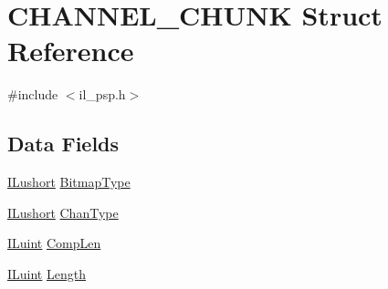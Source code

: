 \hypertarget{struct_c_h_a_n_n_e_l___c_h_u_n_k}{\section{C\-H\-A\-N\-N\-E\-L\-\_\-\-C\-H\-U\-N\-K Struct Reference}
\label{struct_c_h_a_n_n_e_l___c_h_u_n_k}
}


{\ttfamily \#include $<$il\-\_\-psp.\-h$>$}

\subsection*{Data Fields}
\begin{DoxyCompactItemize}
\item 
\hyperlink{il_8h_af6287b43748354a7c4864da43ae56962}{I\-Lushort} \hyperlink{struct_c_h_a_n_n_e_l___c_h_u_n_k_a20cdfbd91909040f376c934cbf801c0b}{Bitmap\-Type}
\item 
\hyperlink{il_8h_af6287b43748354a7c4864da43ae56962}{I\-Lushort} \hyperlink{struct_c_h_a_n_n_e_l___c_h_u_n_k_a35cf121b38b7eb818c3a662802ac29b7}{Chan\-Type}
\item 
\hyperlink{il_8h_ac6508d0e9c19e32f32e00d54b5b8cf30}{I\-Luint} \hyperlink{struct_c_h_a_n_n_e_l___c_h_u_n_k_a73df60c17832e4c88c7e827c78d09838}{Comp\-Len}
\item 
\hyperlink{il_8h_ac6508d0e9c19e32f32e00d54b5b8cf30}{I\-Luint} \hyperlink{struct_c_h_a_n_n_e_l___c_h_u_n_k_a3ed5d34564fb19b1d2884d37b6143e6a}{Length}
\end{DoxyCompactItemize}


